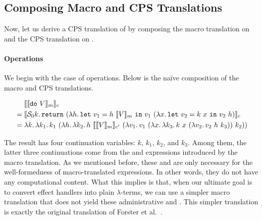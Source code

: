 \subsection{Composing Macro and CPS Translations}
\label{sec:cps:compose}

Now, let us derive a CPS translation of \lambdah by composing the macro
translation on \lambdah and the CPS translation on \lambdasz.

\paragraph{Operations}

We begin with the case of operations.
Below is the na\"ive composition of the macro and CPS translations.

\vspace{-3mm}

\begin{align*}
& \hspace{4.7mm} \llbracket \llbracket \texttt{do} \ V \rrbracket_m \rrbracket_c \\
&= \llbracket \mathcal{S}_0 k.\, \texttt{return} \ (\lambda h.\, \texttt{let} \ v_1 = h \ \llbracket V \rrbracket_m \ \texttt{in} \ v_1 \ (\lambda x.\, \texttt{let} \ v_2 = k \ x \ \texttt{in} \ v_2 \ h) \rrbracket_c \\
&= \lambda k.\, \lambda k_1.\, k_1 \ (\lambda h.\, \lambda k_2.\, h \ \llbracket \llbracket V \rrbracket_m \rrbracket_{c^\prime} \ (\lambda v_1.\, v_1 \ (\lambda x.\, \lambda k_3.\, k \ x \ (\lambda v_2.\, v_2 \ h \ k_3)) \ k_2))
\end{align*}

\vspace{1mm}

\noindent The result has four continuation variables: $k$, $k_1$, $k_2$,
and $k_3$.
Among them, the latter three continuations come from the \returntt and
 expressions introduced by the macro translation.
As we mentioned before, these \returntt and  are only necessary for
the well-formedness of macro-translated expressions.
In other words, they do not have any computational content.
What this implies is that, when our ultimate goal is to convert effect
handlers into plain $\lambda$-terms, we can use a simpler macro translation
that does not yield these administrative \returntt and .
This simpler translation is exactly the original translation of Forster et
al.~\cite{forster-jfp}.


